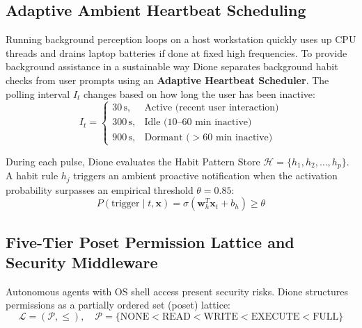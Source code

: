 \documentclass[conference,a4paper]{IEEEtran}
\begin{document}
\subsection{Adaptive Ambient Heartbeat Scheduling}
Running background perception loops on a host workstation quickly uses up CPU threads and drains laptop batteries if done at fixed high frequencies. To provide background assistance in a sustainable way Dione separates background habit checks from user prompts using an \textbf{Adaptive Heartbeat Scheduler}. The polling interval $I_t$ changes based on how long the user has been inactive:
\begin{equation}
I_t = 
\begin{cases}
    30\,\text{s}, & \text{Active (recent user interaction)} \\
    300\,\text{s}, & \text{Idle (10--60 min inactive)} \\
    900\,\text{s}, & \text{Dormant ($>60$ min inactive)}
\end{cases}
\end{equation}

During each pulse, Dione evaluates the Habit Pattern Store $\mathcal{H} = \{h_1, h_2, \dots, h_p\}$. A habit rule $h_j$ triggers an ambient proactive notification when the activation probability surpasses an empirical threshold $\theta = 0.85$:
\begin{equation}
P(\text{trigger} \mid t, \mathbf{x}) = \sigma\left(\mathbf{w}_h^T \mathbf{x}_t + b_h\right) \ge \theta
\end{equation}

\subsection{Five-Tier Poset Permission Lattice and Security Middleware}
Autonomous agents with OS shell access present security risks. Dione structures permissions as a partially ordered set (poset) lattice:
\begin{equation}
\mathcal{L} = (\mathcal{P}, \le), \quad \mathcal{P} = \{\text{NONE} < \text{READ} < \text{WRITE} < \text{EXECUTE} < \text{FULL}\}
\end{equation}
\end{document}

